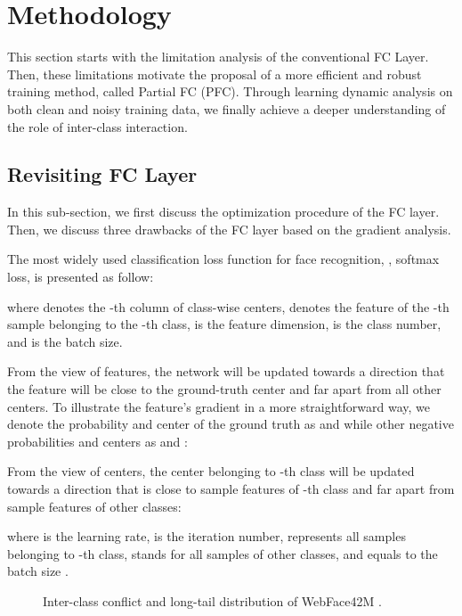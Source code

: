 \documentclass[10pt,twocolumn,letterpaper]{article}
\begin{document}
\section{Methodology}
This section starts with the limitation analysis of the conventional FC Layer. Then, these limitations motivate the proposal of a more efficient and robust training method, called Partial FC (PFC). Through learning dynamic analysis on both clean and noisy training data, we finally achieve a deeper understanding of the role of inter-class interaction.

\subsection{Revisiting FC Layer}
In this sub-section, we first discuss the optimization procedure of the FC layer. Then, we discuss three drawbacks of the FC layer based on the gradient analysis.

The most widely used classification loss function for face recognition, \ie, softmax loss, is presented as follow:

where  denotes the -th column of class-wise centers,  denotes the feature of the -th sample belonging to the -th class,  is the feature dimension,  is the class number, and  is the batch size. 

From the view of features, the network will be updated towards a direction that the feature will be close to the ground-truth center and far apart from all other centers. To illustrate the feature's gradient in a more straightforward way, we denote the probability and center of the ground truth as  and  while other negative probabilities and centers as  and :


From the view of centers, the center  belonging to -th class will be updated towards a direction that is close to sample features of -th class and far apart from sample features of other classes:

where  is the learning rate,  is the iteration number,  represents all samples belonging to -th class,  stands for all samples of other classes, and  equals to the batch size . 

\begin{figure}
\centering
{}
\vspace{-2mm}
\caption{Inter-class conflict and long-tail distribution of WebFace42M \cite{zhu2021webface260m}.}
\vspace{-4mm}
\label{fig:webfaceproblem}
\end{figure}
\end{document}
